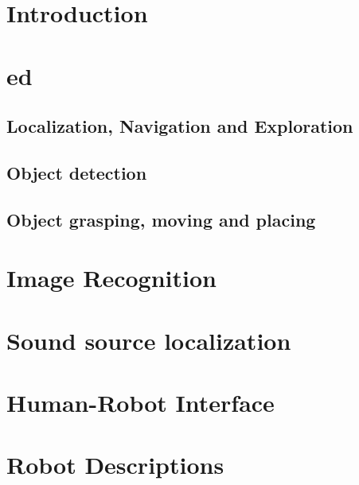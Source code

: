 \documentclass[runningheads,a4paper]{llncs}
\begin{document}

\section{Introduction}


\section{\acrfull{ed}}


\subsection{Localization, Navigation and Exploration}


\subsection{Object detection}


\subsection{Object grasping, moving and placing}


\section{Image Recognition}


\section{Sound source localization}


%

\section{Human-Robot Interface}


\section{Robot Descriptions}
\end{document}
